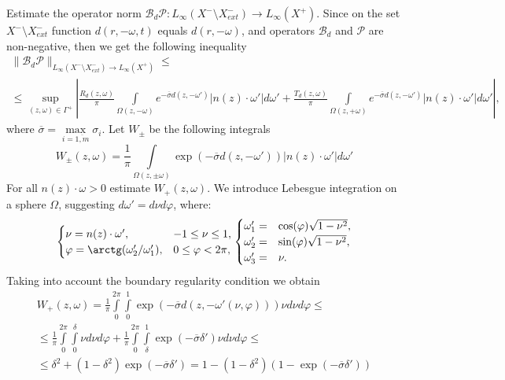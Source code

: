 \documentclass[12pt,reqno]{report}
\begin{document}
Estimate the operator norm
$\mathcal B_d \mathcal P: L_{\infty}(X^-\setminus X^-_{ext})\to L_{\infty}(X^+)$.
Since on the set $X^- \setminus X^-_{ext}$ function $d(r,-\omega,t)$ equals $d(r,-\omega)$,  
and operators $\mathcal B_d$ and $\mathcal P$ are non-negative, then we get the following inequality 
\begin{multline}
\|\mathcal B_d \mathcal  P  \|_{L_{\infty}(X^-\setminus X^-_{ext})\to L_{\infty}(X^+)} \leq \\ \leq  \sup \limits_{(z,\omega)\in \Gamma^+} \left| \frac{R_d (z,\omega)}{\pi}  \int
\limits_{\Omega(z,-\omega)} e^{-\overline{\sigma} d(z,-\omega')} |n(z)\cdot \omega'| d \omega' +   \frac{T_d (z,\omega)}{\pi} \int
\limits_{\Omega(z,+\omega)} e^{-\overline{\sigma} d(z,-\omega')} |n(z)\cdot \omega'| d
\omega'  \right|,
\end{multline}
where $\overline{\sigma}=\max \limits_{i=\overline{1,m}} \sigma_i$.
Let $W_{\pm}$ be the following integrals
$$
W_{\pm}(z,\omega)=\frac{1}{\pi} \int \limits_{\Omega(z,\pm \omega)}\exp \left (- \overline{\sigma} d(z,-\omega')\right)  |n(z)\cdot \omega'| d\omega'
$$
For all $n(z) \cdot \omega>0$ estimate $W_+(z,\omega)$.
We introduce Lebesgue integration on a sphere $\Omega$, suggesting $d\omega'=d\nu d\varphi$, where:
\begin{equation}
\begin{cases}
\nu = n(z) \cdot \omega', & -1 \leq \nu \leq 1, \\
\varphi= \arctg(\omega'_2/\omega'_1), & 0 \leq \varphi < 2 \pi,
\end{cases}
\begin{cases}
\omega'_1=&\cos (\varphi) \sqrt{1-\nu^2}, \\
\omega'_2=&\sin (\varphi) \sqrt{1-\nu^2}, \\
\omega'_3=&\nu.
\end{cases}
\end{equation}
Taking into account the boundary regularity condition we obtain
\begin{multline}
W_+(z,\omega)=\frac{1}{\pi} \int \limits_{0}^{2\pi} \int \limits_{0}^{1} \exp \left (- \overline{\sigma} d(z,-\omega'(\nu,\varphi))\right)  \nu d \nu d\varphi \leq \\  \leq \frac{1}{\pi} \int \limits_{0}^{2\pi} \int \limits_{0}^{\delta}   \nu d \nu d\varphi
+ \frac{1}{\pi} \int \limits_{0}^{2\pi} \int \limits_{\delta}^{1} \exp \left (- \overline{\sigma}\delta'\right)  \nu d \nu d\varphi
\leq \\ \leq
\delta^2 +  (1-\delta^2)\exp \left (- \overline{\sigma} \delta'\right) =1-(1-\delta^2)(1-\exp \left (- \overline{\sigma} \delta'\right))
\end{multline}
\end{document}

